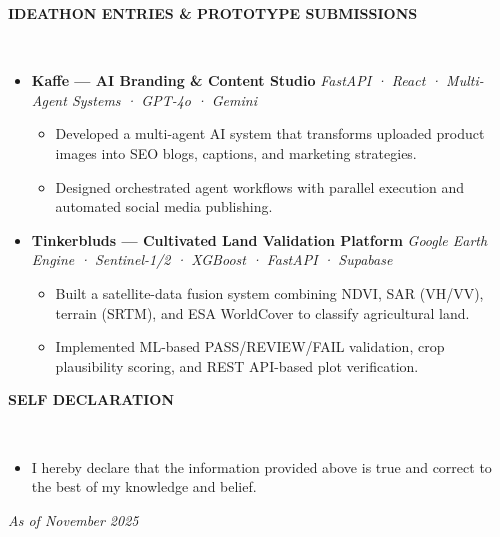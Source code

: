 \documentclass[10pt,a4paper]{article}
\newcommand{\resheading}[1]{{\small \colorbox{mygrey}{\begin{minipage}{0.99\textwidth}{\textbf{#1 \vphantom{p\^{E}}}}\end{minipage}}}}
\begin{document}
\noindent
\resheading{\textbf{IDEATHON ENTRIES \& PROTOTYPE SUBMISSIONS}}\\[-0.1cm]
\begin{itemize}[noitemsep,nolistsep]

\item \textbf{Kaffe — AI Branding \& Content Studio}  
\textit{FastAPI · React · Multi-Agent Systems · GPT-4o · Gemini}  
\begin{itemize}[noitemsep]
    \item Developed a multi-agent AI system that transforms uploaded product images into SEO blogs, captions, and marketing strategies.
    \item Designed orchestrated agent workflows with parallel execution and automated social media publishing.
\end{itemize}

\item \textbf{Tinkerbluds — Cultivated Land Validation Platform}  
\textit{Google Earth Engine · Sentinel-1/2 · XGBoost · FastAPI · Supabase}  
\begin{itemize}[noitemsep]
    \item Built a satellite-data fusion system combining NDVI, SAR (VH/VV), terrain (SRTM), and ESA WorldCover to classify agricultural land.
    \item Implemented ML-based PASS/REVIEW/FAIL validation, crop plausibility scoring, and REST API-based plot verification.
\end{itemize}

\end{itemize}

\vspace{0.2cm}

\vspace{0.2cm}

\noindent
\resheading{\textbf{SELF DECLARATION}}\\[-0.4cm]
\begin{itemize}[leftmargin=*]
    \item I hereby declare that the information provided above is true and correct to the best of my knowledge and belief.
\end{itemize}

\begin{center}
    {\footnotesize \textit{As of November 2025}}
\end{center}
\end{document}
